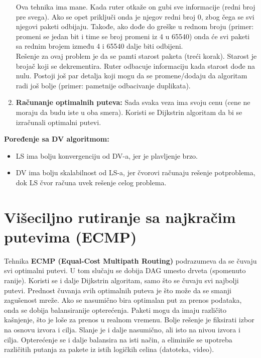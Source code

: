\documentclass[a4paper]{article}
\begin{document}
\begin{enumerate}
              \indent Ova tehnika ima mane. Kada ruter otkaže on gubi sve informacije (redni broj pre
              svega). Ako se opet priključi onda je njegov redni broj 0, zbog čega se svi njegovi
              paketi odbijaju. Takođe, ako dođe do greške u rednom broju (primer: promeni se 
              jedan bit i time se broj promeni iz 4 u 65540) onda će svi paketi sa rednim brojem 
              između 4 i 65540 dalje biti odbijeni. \\
              \indent Rešenje za ovaj problem je da se pamti starost paketa (treći korak).
              Starost je brojač koji se dekrementira. Ruter odbacuje informaciju kada starost
              dođe na nulu. Postoji još par detalja koji mogu da se promene/dodaju da 
              algoritam radi još bolje (primer: pametnije odbacivanje duplikata).
        \item \textbf{Računanje optimalnih puteva:} Sada svaka veza ima svoju cenu (cene ne 
              moraju da budu iste u oba smera). Koristi se Dijkstrin algoritam da bi 
              se izračunali optimalni putevi. 
    \end{enumerate}

    \noindent \textbf{Poređenje sa DV algoritmom:} 
    \begin{itemize}
        \item LS ima bolju konvergenciju od DV-a, jer je plavljenje brzo.
        \item DV ima bolju skalabilnost od LS-a, jer čvorovi računaju rešenje potproblema,
              dok LS čvor računa uvek rešenje celog problema.
    \end{itemize}
    
\section{Višeciljno rutiranje sa najkračim putevima (ECMP)}
    Tehnika \textbf{ECMP (Equal-Cost Multipath Routing)} podrazumeva da se čuvaju svi optimalni putevi.
    U tom slučaju se dobija DAG umesto drveta (spomenuto ranije).
    Koristi se i dalje Dijkstrin algoritam, samo što se čuvaju svi najbolji putevi. 
    Prednost čuvanja svih optimalnih puteva je što može da se smanji zagušenost mreže. Ako
    se nasumično bira optimalan put za prenos podataka, onda se dobija balansiranije opterećenja.
    Paketi mogu da imaju različito kašnjenje, što je loše za prenos u realnom vremenu. Bolje
    rešenje je fiksirati izbor na osnovu izvora i cilja. Slanje je i dalje nasumično, ali
    isto na nivou izvora i cilja. Opterećenje se i dalje balansira na isti način, a eliminiše
    se upotreba različitih putanja za pakete iz istih logičkih celina (datoteka, video).
\end{document}
